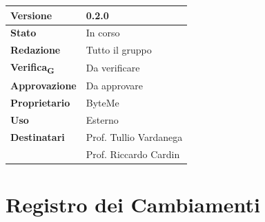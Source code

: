 \documentclass[11pt,a4paper]{article}
\newcommand{\gls}[1]{#1\textsubscript{G}}
\begin{document}
\begin{titlepage}
    \begin{table}[H]
        \centering
        \begin{tabular}{|l|p{5cm}|}
            \hline
            \textbf{Versione} & 0.2.0 \\
            \hline
            \textbf{Stato} & In corso \\
            \hline
            \textbf{Redazione} & Tutto il gruppo\\
            \hline
            \textbf{\gls{Verifica}} & Da verificare\\
            \hline
            \textbf{Approvazione} & Da approvare\\
            \hline
            \textbf{Proprietario} & ByteMe \\
            \hline
            \textbf{Uso} & Esterno \\
            \hline
            \textbf{Destinatari} & Prof. Tullio Vardanega \\ & Prof. Riccardo Cardin \\
            \hline
        \end{tabular}
    \end{table}
    
    \vfill
\end{titlepage}

\thispagestyle{empty}
\section*{Registro dei Cambiamenti}
\end{document}
